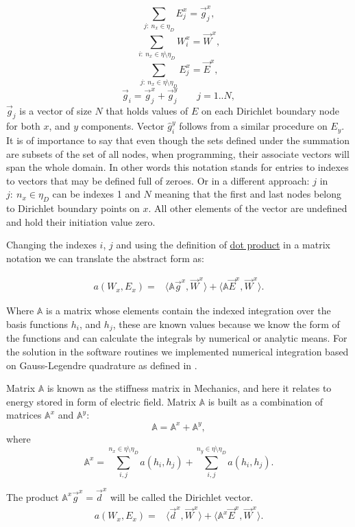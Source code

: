 \[\sum_{j:\ n_x \in \eta_D}E_j^x = \vec{g}_j^x, \]
\[\sum_{i:\ n_x \in \eta\setminus\eta_D}W_i^x = \vec{W}^x,\]
\[\sum_{j:\ n_x \in \eta\setminus\eta_D}E_j^x = \vec{E}^x, \]
\[\vec{g}_i = \vec{g}_j^x+\vec{g}_j^y \qquad j = 1.. N, \]
$\vec{g}_j$ is a vector of size $N$ that holds values of $E$ on each Dirichlet boundary node for both $x$, and $y$ components. Vector $\hat{g}_i^y$ follows from a similar procedure on $E_y$. It is of importance to say that even though the sets defined under the summation are subsets of the set of all nodes, when programming, their associate vectors will span the whole domain. In other words this notation stands for entries to indexes to vectors that may be defined full of zeroes. Or in a different approach: $j$ in $j:\ n_x \in \eta_D$ can be indexes 1 and $N$ meaning that the first and last nodes belong to Dirichlet boundary points on $x$. All other elements of the vector are undefined and hold their initiation value zero.


Changing the indexes $i$, $j$ and using the definition of \href{http://en.wikipedia.org/wiki/Dot_product}{dot product} in a matrix notation we can translate the abstract form as:

\begin{align*}
a\left(W_x,E_x\right)=&\langle \mathbb{A}\vec{g}^x,\vec{W}^x\rangle
+\langle\mathbb{A}\vec{E}^x,\vec{W}^x\rangle . 
\end{align*}

Where $\mathbb{A}$ is a matrix whose elements contain the indexed integration over the basis functions $h_i$, and $h_j$, these are known values because we know the form of the functions and can calculate the integrals by numerical or analytic means. For the solution in the software routines we implemented numerical integration based on Gauss-Legendre quadrature as defined in \cite{Bathe1996}. 

Matrix $\mathbb{A}$ is known as the stiffness matrix in Mechanics, and here it relates to energy stored in form of electric field. Matrix $\mathbb{A}$ is built as a combination of matrices $\mathbb{A}^x$ and $\mathbb{A}^y$:
\[\mathbb{A} = \mathbb{A}^x+\mathbb{A}^y,\]
where
\[\mathbb{A}^x = \sum_{i,j}^{n_x \in \eta\setminus\eta_D} a(h_i,h_j)+\sum_{i,j}^{n_y \in \eta\setminus\eta_D} a(h_i,h_j).\]

The product $\mathbb{A}^x\vec{g}^x = \vec{d}^x$ will be called the Dirichlet vector.
\begin{align}
a\left(W_x,E_x\right)=&\langle \vec{d}^x,\vec{W}^x\rangle
+\langle\mathbb{A}^x\vec{E}^x,\vec{W}^x\rangle. \label{eq:potential_discrete} 
\end{align}

